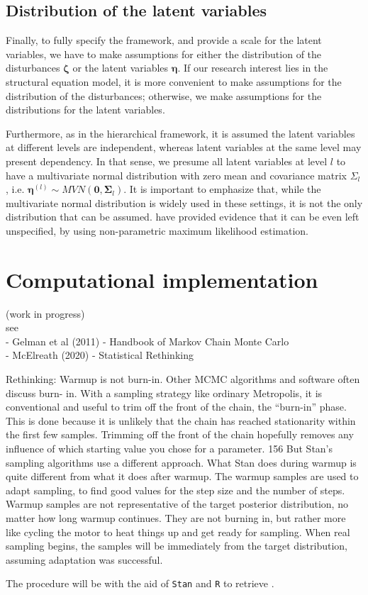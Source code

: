 \subsection{Distribution of the latent variables} \label{s_sect:dist_lv}
Finally, to fully specify the framework, and provide a scale for the latent variables, we have to make assumptions for either the distribution of the disturbances $\pmb{\zeta}$ or the latent variables $\pmb{\eta}$. If our research interest lies in the structural equation model, it is more convenient to make assumptions for the distribution of the disturbances; otherwise, we make assumptions for the distributions for the latent variables. 

Furthermore, as in the hierarchical framework, it is assumed the latent variables at different levels are independent, whereas latent variables at the same level may present dependency. In that sense, we presume all latent variables at level $l$ to have a multivariate normal distribution with zero mean and covariance matrix $\Sigma_{l}$, i.e. $\pmb{\eta}^{(l)} \sim MVN(\mathbf{0}, \pmb{\Sigma}_{l})$. It is important to emphasize that, while the multivariate normal distribution is widely used in these settings, it is not the only distribution that can be assumed. \citet{Rabe_et_al_2003a} have provided evidence that it can be even left unspecified, by using non-parametric maximum likelihood estimation.



\section{Computational implementation} \label{sect:comp_imp}

{\color{red} (work in progress) \\
	see \\
	- Gelman et al (2011) - Handbook of Markov Chain Monte Carlo\\
	- McElreath (2020) - Statistical Rethinking
	
	Rethinking: Warmup is not burn-in. Other MCMC algorithms and software often discuss burn-
	in. With a sampling strategy like ordinary Metropolis, it is conventional and useful to trim off the
	front of the chain, the “burn-in” phase. This is done because it is unlikely that the chain has reached
	stationarity within the first few samples. Trimming off the front of the chain hopefully removes any
	influence of which starting value you chose for a parameter. 156
	But Stan’s sampling algorithms use a different approach. What Stan does during warmup is quite
	different from what it does after warmup. The warmup samples are used to adapt sampling, to find
	good values for the step size and the number of steps. Warmup samples are not representative of
	the target posterior distribution, no matter how long warmup continues. They are not burning in,
	but rather more like cycling the motor to heat things up and get ready for sampling. When real
	sampling begins, the samples will be immediately from the target distribution, assuming adaptation
	was successful.
	
}


The procedure will be with the aid of \texttt{Stan} \cite{Stan2020} and \texttt{R} \cite{R2015, RStan2020} to retrieve . \\
